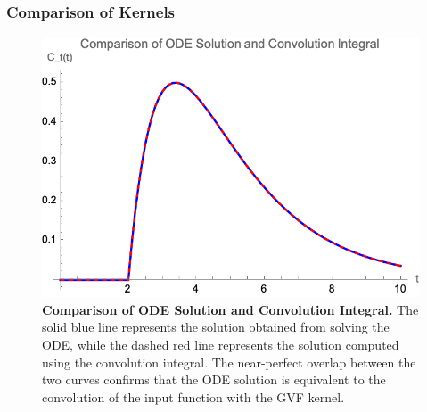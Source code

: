 %
%

\begin{frame}
  \frametitle{Comparison of Kernels}
        \begin{figure}
            \centering
            \includegraphics[width=0.6\linewidth]{figures/method-compare1.png}
            \caption{\textbf{Comparison of ODE Solution and Convolution Integral.} 
            The solid blue line represents the solution obtained from solving the ODE, while the dashed red line represents the solution computed using the convolution integral. The near-perfect overlap between the two curves confirms that the ODE solution is equivalent to the convolution of the input function with the GVF kernel.
            }
            \label{fig:comparision}
        \end{figure}
   

\end{frame}

